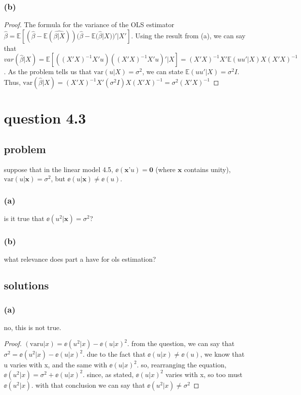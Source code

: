 \documentclass[10pt, a4paper]{article}
\newcommand{\EE}{\mathbb E}
\newcommand{\var}{\text{var}}
\begin{document}
      \subsubsection*{(b)}
        \begin{proof}
          The formula for the variance of the OLS estimator $\hat{\beta} = \EE[(\hat{\beta} - \EE(\hat{\beta|X}))(\hat{\beta}-\EE(\hat{\beta}|X))'|X']$. Using the result from (a), we can say that $var(\hat{\beta}|X) = \EE[((X'X)^{-1}X'u)((X'X)^{-1}X'u)'|X] = (X'X)^{-1}X'\EE(uu'|X)X(X'X)^{-1}$. As the problem tells us that $\var(u|X) = \sigma^2$, we can state $\EE(uu'|X) = \sigma^2I$. Thus, $\var(\hat{\beta}|X) = (X'X)^{-1}X'(\sigma^2I)X(X'X)^{-1} = \sigma^2(X'X)^{-1}$
        \end{proof}
  \section*{question 4.3}
    \subsection*{problem}
      suppose that in the linear model 4.5, $\ee(\textbf{x'}u)=\textbf{0}$ (where $\textbf{x}$ contains unity), $\var(u|\textbf{x})=\sigma^2$, but $\ee(u|\textbf{x})\ne\ee(u)$. 
      \subsubsection*{(a)}
        is it true that $\ee(u^2|\textbf{x}) = \sigma^2$?
      \subsubsection*{(b)}
        what relevance does part a have for ols estimation?
    \subsection*{solutions}
      \subsubsection*{(a)}
        no, this is not true. 
        \begin{proof}
          $(\var{u|x}) = \ee(u^2|x) - \ee(u|x)^2$. from the question, we can say that $\sigma^2 = \ee(u^2|x) - \ee(u|x)^2$. due to the fact that $\ee(u|x)\ne\ee(u)$, we know that u varies with x, and the same with $\ee(u|x)^2$. so, rearranging the equation, $\ee(u^2|x) = \sigma^2 + \ee(u|x)^2$. since, as stated, $\ee(u|x)^2$ varies with x, so too must $\ee(u^2|x)$. with that conclusion we can say that $\ee(u^2|x)\ne\sigma^2$ 
        \end{proof}
\end{document}
